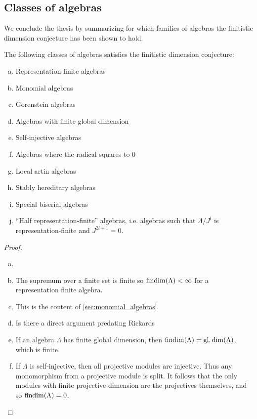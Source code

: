 \subsection{Classes of algebras}

We conclude the thesis by summarizing for which families of algebras the finitistic dimension conjecture has been shown to hold.

\begin{theorem}
	The following classes of algebras satisfies the finitistic dimension conjecture:
	\begin{enumerate}[a)]
		\item Representation-finite algebras
		\item Monomial algebras
		\item Gorenstein algebras
		\item Algebras with finite global dimension
		\item Self-injective algebras
		\item Algebras where the radical squares to 0
		\item Local artin algebras
		\item Stably hereditary algebras
		\item Special biserial algebras
		\item ``Half representation-finite'' algebras, i.e. algebras such that $\Lambda/J^l$ is representation-finite and $J^{2l+1}=0$.
	\end{enumerate}
	\begin{proof}
		\begin{enumerate}[(a)]
			\item[]
			\item The supremum over a finite set is finite so $\operatorname{findim}(\Lambda) < \infty$ for a representation finite algebra.
			\item This is the content of \cref{sec:monomial_algebras}.
			\item Is there a direct argument predating Rickards
			\item If an algebra $\Lambda$ has finite global dimension, then $\operatorname{findim}(\Lambda) = \operatorname{gl.dim}(\Lambda)$, which is finite.
			\item If $\Lambda$ is self-injective, then all projective modules are injective. Thus any monomorphism from a projective module is split. It follows that the only modules with finite projective dimension are the projectives themselves, and so $\operatorname{findim}(\Lambda)=0$.

\end{enumerate}
\end{proof}
\end{theorem}

